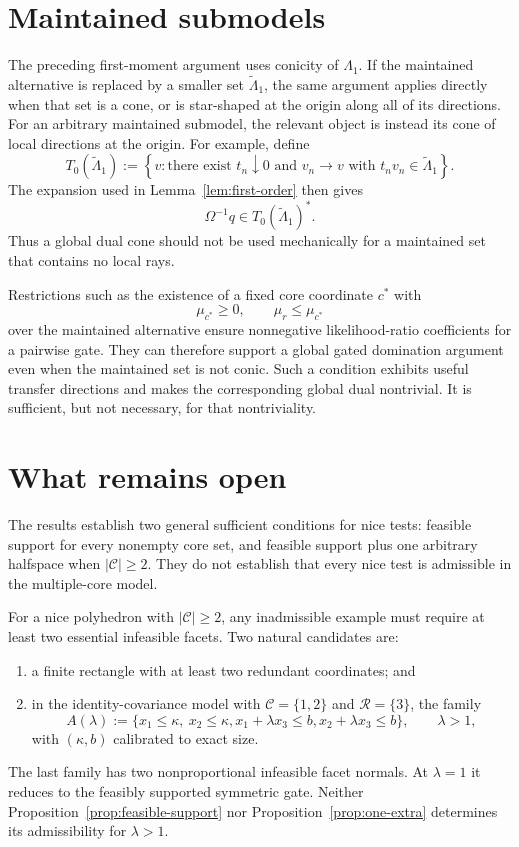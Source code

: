 \documentclass[12pt]{article}
\theoremstyle{definition}
\theoremstyle{remark}
\newcommand{\cC}{\mathcal C}
\newcommand{\cR}{\mathcal R}
\newcommand{\1}{\mathbf 1}
\begin{document}
\section{Maintained submodels}

The preceding first-moment argument uses conicity of $\Lambda_1$.  If the
maintained alternative is replaced by a smaller set
$\widetilde\Lambda_1$, the same argument applies directly when that set is
a cone, or is star-shaped at the origin along all of its directions.  For an
arbitrary maintained submodel, the relevant object is instead its cone of
local directions at the origin.  For example, define
\[
T_0(\widetilde\Lambda_1)
:=
\left\{v:\text{there exist }t_n\downarrow0\text{ and }v_n\to v
\text{ with }t_nv_n\in\widetilde\Lambda_1\right\}.
\]
The expansion used in Lemma~\ref{lem:first-order} then gives
\[
\Omega^{-1}q\in T_0(\widetilde\Lambda_1)^*.
\]
Thus a global dual cone should not be used mechanically for a maintained set
that contains no local rays.

Restrictions such as the existence of a fixed core coordinate $c^*$ with
\[
\mu_{c^*}\ge0,
\qquad
\mu_r\le\mu_{c^*}
\]
over the maintained alternative ensure nonnegative likelihood-ratio
coefficients for a pairwise gate.  They can therefore support a global gated
domination argument even when the maintained set is not conic.  Such a
condition exhibits useful transfer directions and makes the corresponding
global dual nontrivial.  It is sufficient, but not necessary, for that
nontriviality.

\section{What remains open}

The results establish two general sufficient conditions for nice tests:
feasible support for every nonempty core set, and feasible support plus one
arbitrary halfspace when $|\cC|\ge2$.  They do not establish that every nice
test is admissible in the multiple-core model.

For a nice polyhedron with $|\cC|\ge2$, any inadmissible example must require
at least two essential infeasible facets.  Two natural candidates are:
\begin{enumerate}
\item a finite rectangle with at least two redundant coordinates; and
\item in the identity-covariance model with
$\cC=\{1,2\}$ and $\cR=\{3\}$, the family
\begin{equation}\label{eq:two-bad-family}
A(\lambda)
:=
\{x_1\le\kappa,\ x_2\le\kappa,
x_1+\lambda x_3\le b,
x_2+\lambda x_3\le b\},
\qquad \lambda>1,
\end{equation}
with $(\kappa,b)$ calibrated to exact size.
\end{enumerate}
The last family has two nonproportional infeasible facet normals.  At
$\lambda=1$ it reduces to the feasibly supported symmetric gate.  Neither
Proposition~\ref{prop:feasible-support} nor
Proposition~\ref{prop:one-extra} determines its admissibility for
$\lambda>1$.
\end{document}
